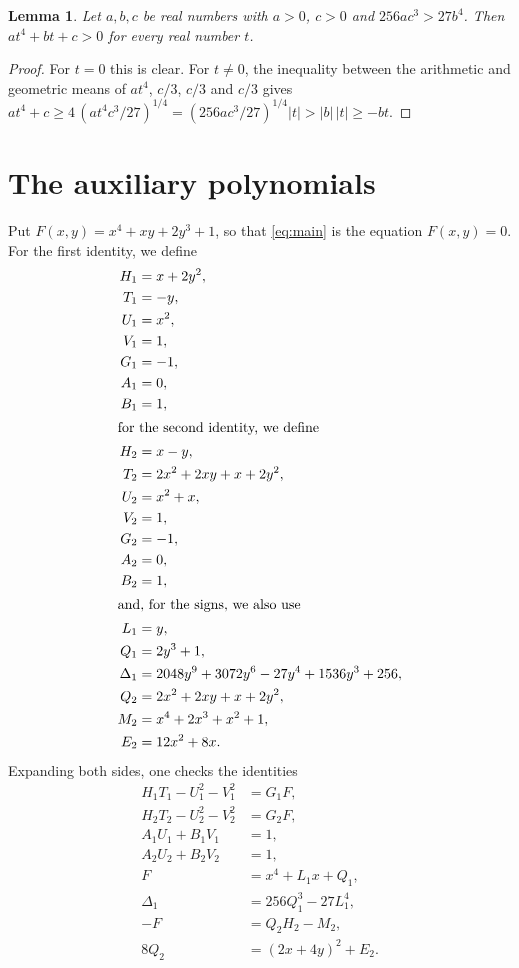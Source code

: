 \documentclass[11pt]{article}
\newtheorem{lemma}[theorem]{Lemma}
\begin{document}
\begin{lemma}\label{lem:amgm}
Let $a,b,c$ be real numbers with $a>0$, $c>0$ and $256ac^3>27b^4$. Then $at^4+bt+c>0$ for every real number $t$.
\end{lemma}

\begin{proof}
For $t=0$ this is clear. For $t\neq0$, the inequality between the arithmetic and geometric means of $at^4$, $c/3$, $c/3$ and $c/3$ gives $at^4+c\geq4\,(at^4c^3/27)^{1/4}=(256ac^3/27)^{1/4}|t|>|b|\,|t|\geq-bt$.
\end{proof}

\section{The auxiliary polynomials}

Put $F(x,y)=x^{4}+xy+2y^{3}+1$, so that \eqref{eq:main} is the equation $F(x,y)=0$.
For the first identity, we define
\begin{align*}
H_{1}&=x+2y^{2},\\
T_{1}&=-y,\\
U_{1}&=x^{2},\\
V_{1}&=1,\\
G_{1}&=-1,\\
A_{1}&=0,\\
B_{1}&=1,\\
\intertext{for the second identity, we define}
H_{2}&=x-y,\\
T_{2}&=2x^{2}+2xy+x+2y^{2},\\
U_{2}&=x^{2}+x,\\
V_{2}&=1,\\
G_{2}&=-1,\\
A_{2}&=0,\\
B_{2}&=1,\\
\intertext{and, for the signs, we also use}
L_{1}&=y,\\
Q_{1}&=2y^{3}+1,\\
\Delta_{1}&=2048y^{9}+3072y^{6}-27y^{4}+1536y^{3}+256,\\
Q_{2}&=2x^{2}+2xy+x+2y^{2},\\
M_{2}&=x^{4}+2x^{3}+x^{2}+1,\\
E_{2}&=12x^{2}+8x.
\end{align*}
Expanding both sides, one checks the identities
\begin{align}
H_{1}T_{1}-U_{1}^2-V_{1}^2&=G_{1}F,\label{eq:norm1}\\
H_{2}T_{2}-U_{2}^2-V_{2}^2&=G_{2}F,\label{eq:norm2}\\
A_{1}U_{1}+B_{1}V_{1}&=1,\label{eq:bez1}\\
A_{2}U_{2}+B_{2}V_{2}&=1,\label{eq:bez2}\\
F&=x^4+L_{1}x+Q_{1},\label{eq:sign1}\\
\Delta_{1}&=256Q_{1}^3-27L_{1}^4,\label{eq:sign1b}\\
-F&=Q_{2}H_{2}-M_{2},\label{eq:sign2}\\
8Q_{2}&=(2x+4y)^2+E_{2}.\label{eq:sign2b}
\end{align}
\end{document}
